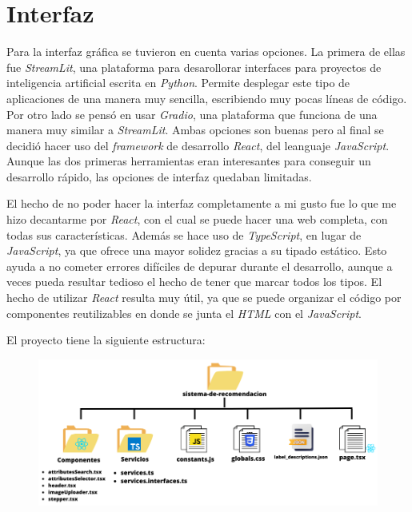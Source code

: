 \documentclass[12pt]{report} %
\begin{document}
	\section{Interfaz}

	Para la interfaz gráfica se tuvieron en cuenta varias opciones. La primera de ellas fue \textit{StreamLit}, una plataforma
	para desarollorar interfaces para proyectos de inteligencia artificial escrita en \textit{Python}. Permite desplegar este
	tipo de aplicaciones de una manera muy sencilla, escribiendo muy pocas líneas de código. Por otro lado se pensó en usar
	\textit{Gradio}, una plataforma que funciona de una manera muy similar a \textit{StreamLit}. Ambas opciones son buenas
	pero al final se decidió hacer uso del \textit{framework} de desarrollo \textit{React}, del leanguaje \textit{JavaScript}.
	Aunque las dos primeras herramientas eran interesantes para conseguir un desarrollo rápido, las opciones de interfaz quedaban limitadas.

	El hecho de no poder hacer la interfaz completamente a mi gusto fue lo que me hizo decantarme por \textit{React}, con el cual
	se puede hacer una web completa, con todas sus características. Además se hace uso de \textit{TypeScript}, en lugar
	de \textit{JavaScript}, ya que ofrece una mayor solidez gracias a su tipado estático. Esto ayuda a no cometer errores difíciles de
	depurar durante el desarrollo, aunque a veces pueda resultar tedioso el hecho de tener que marcar todos los tipos. El hecho de utilizar
	\textit{React} resulta muy útil, ya que se puede organizar el código por componentes reutilizables en donde se junta el \textit{HTML}
	con el \textit{JavaScript}.

	El proyecto tiene la siguiente estructura:
	\begin{figure}[H]
		{\includegraphics[scale=0.6]{estructura-carpetas.png}}
	\end{figure}
\end{document}
